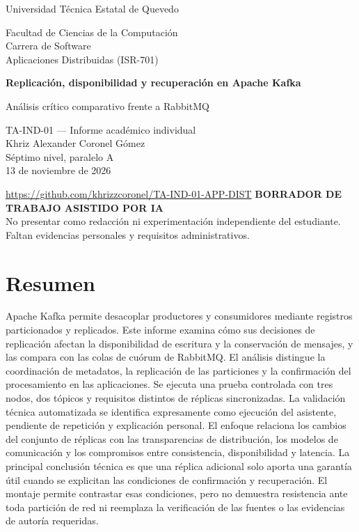 \documentclass[11pt,a4paper]{article}
\begin{document}
\hypersetup{pageanchor=false}
\begin{titlepage}\centering
{\Large Universidad Técnica Estatal de Quevedo\par}\vspace{5mm}
Facultad de Ciencias de la Computación\\Carrera de Software\\Aplicaciones Distribuidas (ISR-701)\vspace{18mm}

{\LARGE\bfseries Replicación, disponibilidad y recuperación en Apache Kafka\par}\vspace{5mm}
{\Large Análisis crítico comparativo frente a RabbitMQ\par}\vspace{15mm}
TA-IND-01 --- Informe académico individual\\Khriz Alexander Coronel Gómez\\Séptimo nivel, paralelo A\\13 de noviembre de 2026\vspace{10mm}

\url{https://github.com/khrizzcoronel/TA-IND-01-APP-DIST}\vfill
\textbf{BORRADOR DE TRABAJO ASISTIDO POR IA}\\
No presentar como redacción ni experimentación independiente del estudiante.\\
Faltan evidencias personales y requisitos administrativos.
\end{titlepage}
\hypersetup{pageanchor=true}

\section*{Resumen}
Apache Kafka permite desacoplar productores y consumidores mediante registros particionados y replicados. Este informe examina cómo sus decisiones de replicación afectan la disponibilidad de escritura y la conservación de mensajes, y las compara con las colas de cuórum de RabbitMQ. El análisis distingue la coordinación de metadatos, la replicación de las particiones y la confirmación del procesamiento en las aplicaciones. Se ejecuta una prueba controlada con tres nodos, dos tópicos y requisitos distintos de réplicas sincronizadas. La validación técnica automatizada se identifica expresamente como ejecución del asistente, pendiente de repetición y explicación personal. El enfoque relaciona los cambios del conjunto de réplicas con las transparencias de distribución, los modelos de comunicación y los compromisos entre consistencia, disponibilidad y latencia. La principal conclusión técnica es que una réplica adicional solo aporta una garantía útil cuando se explicitan las condiciones de confirmación y recuperación. El montaje permite contrastar esas condiciones, pero no demuestra resistencia ante toda partición de red ni reemplaza la verificación de las fuentes o las evidencias de autoría requeridas.
\end{document}

